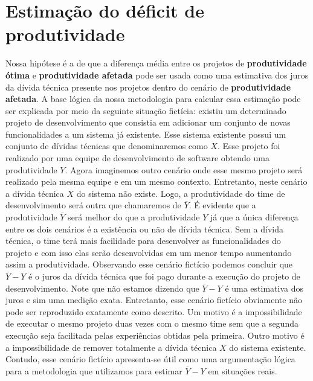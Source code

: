 \section{Estimação do déficit de produtividade}


Nossa hipótese é a de que a diferença média entre os projetos de  \textbf{produtividade ótima} e \textbf{produtividade afetada} pode ser usada como uma estimativa dos juros da dívida técnica presente nos projetos dentro do cenário de  \textbf{produtividade afetada}. A base lógica da nossa metodologia para calcular essa estimação pode ser explicada por meio da seguinte situação fictícia: existiu um determinado projeto de  desenvolvimento que consistia em adicionar um conjunto de novas funcionalidades a um sistema já existente. Esse sistema existente possui um conjunto de dívidas técnicas que denominaremos como $X$.  Esse projeto foi realizado por uma equipe de desenvolvimento de software obtendo uma produtividade $Y$.  Agora imaginemos outro cenário onde esse mesmo projeto será realizado pela mesma equipe e em um mesmo contexto. Entretanto, neste cenário a dívida técnica $X$ do sistema  não existe. Logo, a produtividade do time de desenvolvimento será outra que chamaremos de $\overline{Y}$. É evidente que  a produtividade $\overline{Y}$ será melhor do que a produtividade  $Y$ já que a única diferença entre os dois cenários é a existência ou não de dívida técnica. Sem a dívida técnica, o time terá mais facilidade para desenvolver as funcionalidades do projeto e com isso elas serão desenvolvidas em um menor tempo aumentando assim a produtividade. Observando esse cenário fictício podemos concluir que $\overline{Y} - Y$ é o juros da dívida técnica que foi pago durante a execução do projeto de desenvolvimento. Note que não estamos dizendo que  $\overline{Y} - Y$  é uma estimativa dos juros e sim uma medição exata. Entretanto, esse cenário fictício obviamente não pode ser reproduzido exatamente como descrito. Um motivo é a impossibilidade de executar o mesmo projeto duas vezes com o mesmo time sem que a segunda execução seja facilitada pelas experiências obtidas pela primeira. Outro motivo é a impossibilidade de remover totalmente a dívida técnica $X$ do sistema existente. Contudo, esse cenário fictício apresenta-se útil como uma argumentação lógica para a metodologia que utilizamos para estimar $\overline{Y} - Y$ em situações reais.

